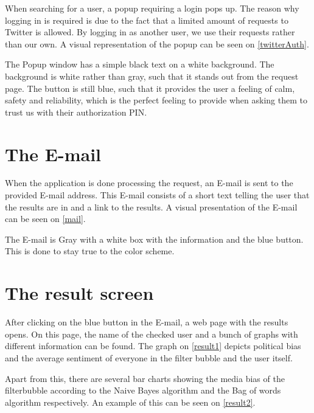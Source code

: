 When searching for a user, a popup requiring a login pops up. The reason why
logging in is required is due to the fact that a limited amount of requests to
Twitter is allowed. By logging in as another user, we use their requests rather
than our own. A visual representation of the popup can be seen on
\autoref{twitterAuth}.


The Popup window has a simple black text on a white background. The background
is white rather than gray, such that it stands out from the request page. The
button is still blue, such that it provides the user a feeling of calm, safety
and reliability, which is the perfect feeling to provide when asking them to
trust us with their authorization PIN\citep[p. 61]{WebUI}.

\section{The E-mail}
When the application is done processing the request, an E-mail is sent to the
provided E-mail address. This E-mail consists of a short text telling the user
that the results are in and a link to the results. A visual presentation of the
E-mail can be seen on \autoref{mail}.


The E-mail is Gray with a white box with the information and the blue button.
This is done to stay true to the color scheme. 

\section{The result screen}
After clicking on the blue button in the E-mail, a web page with the results
opens. On this page, the name of the checked user and a bunch of graphs with
different information can be found.
The graph on \autoref{result1} depicts political
bias and the average sentiment of everyone in the filter bubble and the user
itself. 


Apart from this, there are several bar charts showing the media bias of the
filterbubble according to the Naive Bayes algorithm and the Bag of words
algorithm respectively. An example of this can be seen on \autoref{result2}. 



